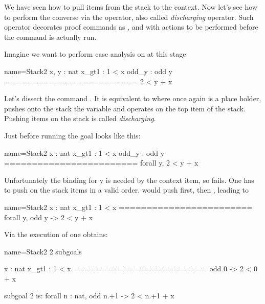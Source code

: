 \index[ssr]{\C{:}}

We have seen how to pull items from the stack to the context.  Now let's see
how to perform the converse via the \C{:} operator, also called
\emph{discharging} operator.  Such operator decorates
proof commands as ,  and 
 with actions to be performed before the command is actually run.


Imagine we want to perform case analysis on  at this stage

\begin{coqout}{name=Stack2}{}
 x, y : nat
 x_gt1 : 1 < x
 odd_y : odd y
 ========================
 2 < y + x
\end{coqout}

Let's dissect the command .  It is equivalent to
 where  once again is a place holder,
 pushes onto the stack the  variable and 
operates on the top item of the stack.
Pushing items on the stack is called \emph{discharging}.

Just before running  the goal looks like this:

\begin{coqout}{name=Stack2}{}
 x : nat
 x_gt1 : 1 < x
 odd_y : odd y
 ========================
 forall y, 2 < y + x
\end{coqout}

Unfortunately the binding for y is needed by the 
context item, so  fails.  One has to push on the stack
items in a valid order.   would push 
first, then , leading to

\begin{coqout}{name=Stack2}{}
 x : nat
 x_gt1 : 1 < x
 ========================
 forall y, odd y -> 2 < y + x
\end{coqout}

Via the execution of  one obtains:

\begin{coqout}{name=Stack2}{}
2 subgoals

  x : nat
  x_gt1 : 1 < x
  ========================
   odd 0 -> 2 < 0 + x

subgoal 2 is:
 forall n : nat, odd n.+1 -> 2 < n.+1 + x
\end{coqout}

